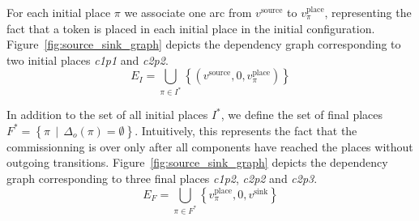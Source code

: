 



For each initial place $\pi$ we associate one arc from $v^\text{source}$
 to $v_\pi^\text{place}$, representing the fact that a token is placed in each
 initial place in the initial configuration.
Figure~\ref{fig:source_sink_graph} depicts the dependency graph corresponding to two initial
places \emph{c1p1} and \emph{c2p2}.
\[
E_I=\bigcup_{\pi\in I^*}\left\{ \left(v^\text{source},0,v_\pi^\text{place}\right)\right\} 
\]

In addition to the set of all initial places $I^*$, we define the set
of final places $F^* = \left\{ \pi\,\mid\, \Delta_o(\pi)
= \emptyset\right\}$. Intuitively, this represents the fact that the
commissionning is over only after all components have reached the
places without outgoing transitions.
Figure~\ref{fig:source_sink_graph} depicts the dependency graph
corresponding to three final places \emph{c1p2}, \emph{c2p2}
and \emph{c2p3}.
\[
E_F=\bigcup_{\pi\in F^*}\left\{ v_\pi^\text{place},0,v^\text{sink}\right\} 
\]


